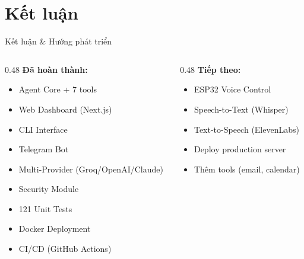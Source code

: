 \documentclass[aspectratio=169,12pt]{beamer}
\begin{document}
\section{Kết luận}

\begin{frame}{Kết luận \& Hướng phát triển}
    \begin{columns}[T]
        \begin{column}{0.48\textwidth}
            \textbf{\color{secondarygreen} Đã hoàn thành:}
            \begin{itemize}
                \item[$\checkmark$] Agent Core + 7 tools
                \item[$\checkmark$] Web Dashboard (Next.js)
                \item[$\checkmark$] CLI Interface
                \item[$\checkmark$] Telegram Bot
                \item[$\checkmark$] Multi-Provider (Groq/OpenAI/Claude)
                \item[$\checkmark$] Security Module
                \item[$\checkmark$] 121 Unit Tests
                \item[$\checkmark$] Docker Deployment
                \item[$\checkmark$] CI/CD (GitHub Actions)
            \end{itemize}
        \end{column}
        \begin{column}{0.48\textwidth}
            \textbf{\color{warningorange} Tiếp theo:}
            \begin{itemize}
                \item ESP32 Voice Control
                \item Speech-to-Text (Whisper)
                \item Text-to-Speech (ElevenLabs)
                \item Deploy production server
                \item Thêm tools (email, calendar)
            \end{itemize}


\end{column}
\end{columns}
\end{frame}
\end{document}
